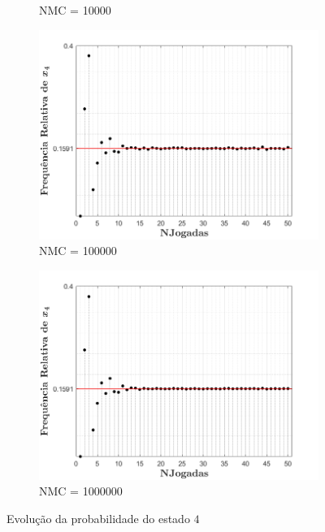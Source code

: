 \begin{figure}[ht]
\begin{subfigure}[b]{0.5\linewidth}
        \caption{NMC = 10000} 
        \label{fig:P310000} 
        \vspace{1ex}
    \end{subfigure} 
    \begin{subfigure}[b]{0.5\linewidth}
        \centering
        \includegraphics[width=1\linewidth]{img/P3/P3100000.png}
        \caption{NMC = 100000} 
        \label{fig:P3100000} 
    \end{subfigure}%
    \begin{subfigure}[b]{0.5\linewidth}
        \centering
        \includegraphics[width=1\linewidth]{img/P3/P31000000.png} 
        \caption{NMC = 1000000} 
        \label{fig:P31000000} 
    \end{subfigure} 
    \caption{Evolução da probabilidade do estado $4$}
    \label{fig:LABEL}
\end{figure}

